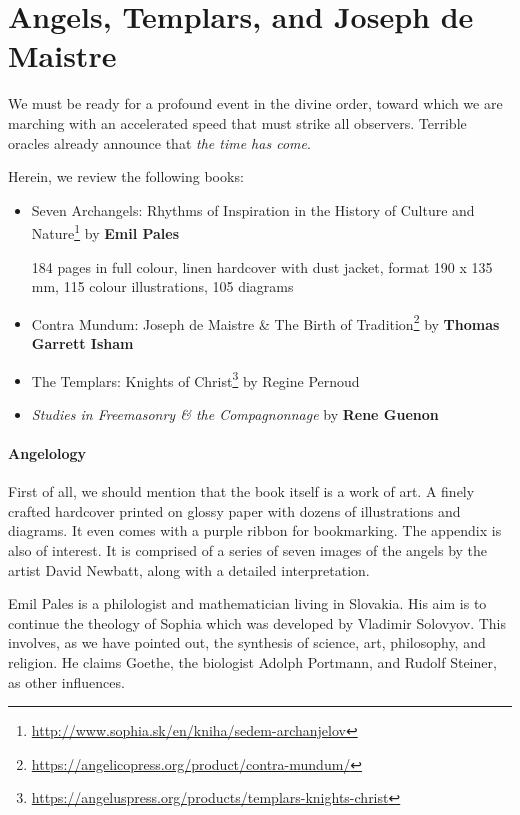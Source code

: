 \section{Angels, Templars, and Joseph de Maistre}

\begin{quotex}
We must be ready for a profound event in the divine order, toward which we are marching with an accelerated speed that must strike all observers. Terrible oracles already announce that \emph{the time has come}.
\end{quotex}


Herein, we review the following books:

\begin{itemize}


\item Seven Archangels: Rhythms of Inspiration in the History of Culture and Nature\footnote{\url{http://www.sophia.sk/en/kniha/sedem-archanjelov}} by \textbf{Emil Pales}

184 pages in full colour, linen hardcover with dust jacket, format 190 x 135 mm, 115 colour illustrations, 105 diagrams

\item Contra Mundum: Joseph de Maistre \& The Birth of Tradition\footnote{\url{https://angelicopress.org/product/contra-mundum/}} by \textbf{Thomas Garrett Isham}

\item The Templars: Knights of Christ\footnote{\url{https://angeluspress.org/products/templars-knights-christ}} by Regine Pernoud

\item \emph{Studies in Freemasonry \& the Compagnonnage} by \textbf{Rene Guenon}
\end{itemize}


\paragraph{Angelology}


First of all, we should mention that the book itself is a work of art. A finely crafted hardcover printed on glossy paper with dozens of illustrations and diagrams. It even comes with a purple ribbon for bookmarking. The appendix is also of interest. It is comprised of a series of seven images of the angels by the artist David Newbatt, along with a detailed interpretation.

Emil Pales is a philologist and mathematician living in Slovakia. His aim is to continue the theology of Sophia which was developed by Vladimir Solovyov. This involves, as we have pointed out, the synthesis of science, art, philosophy, and religion. He claims Goethe, the biologist Adolph Portmann, and Rudolf Steiner, as other influences.

